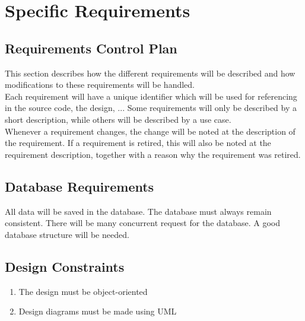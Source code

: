 \chapter{Specific Requirements}

\section{Requirements Control Plan}
	This section describes how the different requirements will be described and how 
	modifications to these requirements will be handled. \\
	Each requirement will have a unique identifier which will be used for referencing 
	in the source code, the design, ... Some requirements will only be described by
	a short description, while others will be described by a use case. \\
	Whenever a requirement changes, the change will be noted at the description of 
	the requirement. If a requirement is retired, this will also be noted at the
	requirement description, together with a reason why the requirement was retired.






\section{Database Requirements}
	All data will be saved in the database. The database must always remain consistent. There will be many concurrent request 
	for the database. A good database structure will be needed. 
\section{Design Constraints}
	\begin{enumerate}
		\item The design must be object-oriented
		\item Design diagrams must be made using UML
	\end{enumerate}
